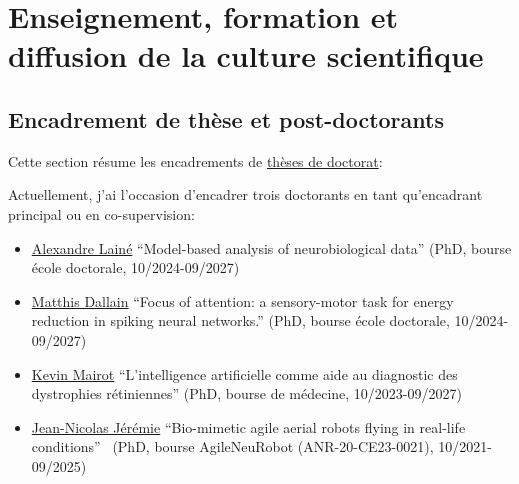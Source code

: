 \documentclass[10pt,french,a4paper,oneside]{article}%
\begin{document}
\section{Enseignement, formation et diffusion de la culture scientifique} %

\subsection{Encadrement de thèse et post-doctorants} %

%
%
Cette section résume les encadrements de \href{https://www.theses.fr/074493701}{thèses de doctorat}:

Actuellement, j'ai l'occasion d'encadrer trois doctorants %
en tant qu'encadrant principal ou en co-supervision:


\begin{itemize}
	\item \href{https://laurentperrinet.github.io/author/alexandre-lain%C3%A9/}{Alexandre Lainé} ``Model-based analysis of neurobiological data'' (PhD, bourse école doctorale, 10/2024-09/2027)
	\item \href{https://laurentperrinet.github.io/author/alexandre-lain%C3%A9/}{Matthis Dallain} ``Focus of attention: a sensory-motor task for energy reduction in spiking neural networks.'' (PhD, bourse école doctorale, 10/2024-09/2027)
	\item \href{https://laurentperrinet.github.io/author/kevin-mairot/}{Kevin Mairot} ``L’intelligence artificielle comme aide au diagnostic des dystrophies rétiniennes'' (PhD, bourse de médecine, 10/2023-09/2027)
	\item \href{https://laurentperrinet.github.io/author/jean-nicolas-jeremie/}{Jean-Nicolas Jérémie} ``Bio-mimetic agile aerial robots flying in real-life conditions''~\textcite{Jeremie25thesis} (PhD, bourse AgileNeuRobot (ANR-20-CE23-0021), 10/2021-09/2025)
\end{itemize}
\end{document}
